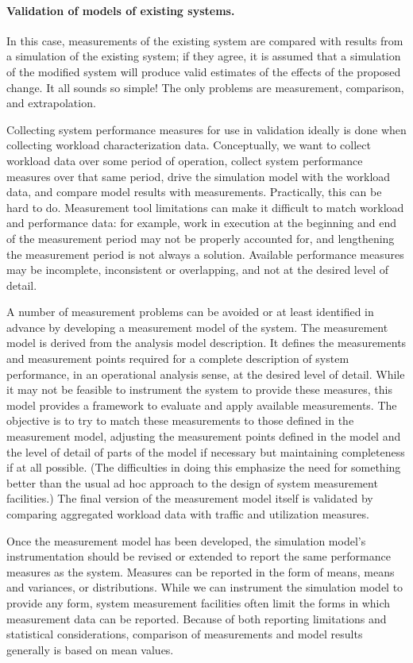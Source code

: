 \paragraph{Validation of models of existing systems.}
In this case, measurements of the existing system are compared with results
from a simulation of the existing system; if they agree, it is assumed that a
simulation of the modified system will produce valid estimates of the effects
of the proposed change. It all sounds so simple! The only problems are
measurement, comparison, and extrapolation.

Collecting system performance measures for use in validation ideally is done
when collecting workload characterization data. Conceptually, we want to
collect workload data over some period of operation, collect system
performance measures over that same period, drive the simulation model with
the workload data, and compare model results with measurements. Practically,
this can be hard to do. Measurement tool limitations can make it difficult to
match workload and performance data: for example, work in execution at the
beginning and end of the measurement period may not be properly accounted
for, and lengthening the measurement period is not always a solution.
Available performance measures may be incomplete, inconsistent or overlapping,
and not at the desired level of detail.

A number of measurement problems can be avoided or at least identified in
advance by developing a measurement model of the system. The measurement
model is derived from the analysis model description. It defines the
measurements and measurement points required for a complete description of
system performance, in an operational analysis sense, at the desired level of
detail. While it may not be feasible to instrument the system to provide these
measures, this model provides a framework to evaluate and apply available
measurements. The objective is to try to match these measurements to those
defined in the measurement model, adjusting the measurement points defined in
the model and the level of detail of parts of the model if necessary but
maintaining completeness if at all possible. (The difficulties in doing this
emphasize the need for something better than the usual ad hoc approach to the
design of system measurement facilities.) The final version of the measurement
model itself is validated by comparing aggregated workload data with traffic
and utilization measures.

Once the measurement model has been developed, the simulation model's
instrumentation should be revised or extended to report the same performance
measures as the system. Measures can be reported in the form of means, means
and variances, or distributions. While we can instrument the simulation model
 to provide any form, system measurement facilities often limit the forms in
which measurement data can be reported. Because of both reporting limitations
and statistical considerations, comparison of measurements and model results
generally is based on mean values.

